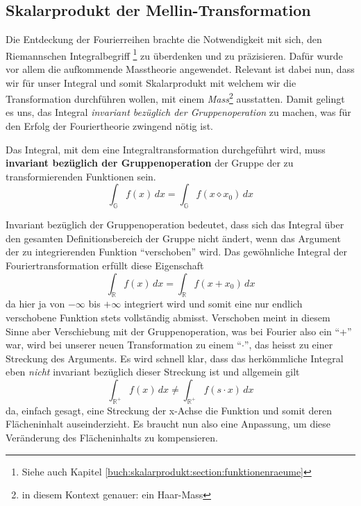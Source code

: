 \subsection{Skalarprodukt der Mellin-Transformation
\label{mellin:subsection:skalarprodukt}}
Die Entdeckung der Fourierreihen brachte die Notwendigkeit mit sich, den Riemannschen Integralbegriff
\footnote{Siehe auch Kapitel \ref{buch:skalarprodukt:section:funktionenraeume}} zu überdenken und zu präzisieren.
Dafür wurde vor allem die aufkommende Masstheorie angewendet.
Relevant ist dabei nun, dass wir für unser Integral und somit Skalarprodukt mit welchem wir die Transformation durchführen wollen, 
mit einem \emph{Mass}\footnote{in diesem Kontext genauer: ein Haar-Mass} ausstatten. 
Damit gelingt es uns, das Integral \emph{invariant bezüglich der Gruppenoperation} zu machen, was für den Erfolg der Fouriertheorie 
zwingend nötig ist. 
\begin{satz}
    \label{buch:papers:mellin:teil2:satz:int}
    Das Integral, mit dem eine Integraltransformation durchgeführt wird, muss \textbf{invariant bezüglich der Gruppenoperation} 
    der Gruppe der zu transformierenden Funktionen sein.
    \[
        \int_\mathbb{G} f(x)\,dx = \int_\mathbb{G} f(x \diamond x_0)\,dx
    \]
\end{satz}
Invariant bezüglich der Gruppenoperation bedeutet, dass sich das Integral über den gesamten Definitionsbereich der Gruppe nicht 
ändert, wenn das Argument der zu integrierenden Funktion ``verschoben'' wird. 
Das gewöhnliche Integral der Fouriertransformation erfüllt diese Eigenschaft 
\begin{equation}
    \int_\mathbb{R} f(x)\,dx = \int_\mathbb{R} f(x + x_0)\,dx
\end{equation}
da hier ja von $-\infty$ bis $+\infty$ integriert wird und somit eine nur endlich verschobene Funktion stets vollständig abmisst.
Verschoben meint in diesem Sinne aber Verschiebung mit der Gruppenoperation, was bei Fourier also ein ``+'' war, wird bei unserer 
neuen Transformation zu einem ``$\cdot$'', das heisst zu einer Streckung des Arguments. 
Es wird schnell klar, dass das herkömmliche Integral eben \emph{nicht} invariant bezüglich dieser Streckung ist und allgemein gilt 
\begin{equation}
    \int_\mathbb{R^+} f(x)\,dx \neq \int_\mathbb{R^+} f(s \cdot x)\,dx
\end{equation}
da, einfach gesagt, eine Streckung der x-Achse die Funktion und somit deren Flächeninhalt auseinderzieht.
Es braucht nun also eine Anpassung, um diese Veränderung des Flächeninhalts zu kompensieren.
